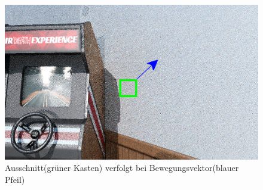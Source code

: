 \begin{figure}[H]
  \begin{tcolorbox}
  \centering
  \includegraphics[width=0.5\linewidth]{content/TemporalerAlg/Bilder/Reprojection/Szene_bearbeitet.png}
  \end{tcolorbox}
  \caption{Ausschnitt(grüner Kasten) verfolgt bei Bewegungsvektor(blauer Pfeil)}
  \label{pic:TemporalReprComparison}
\end{figure}


